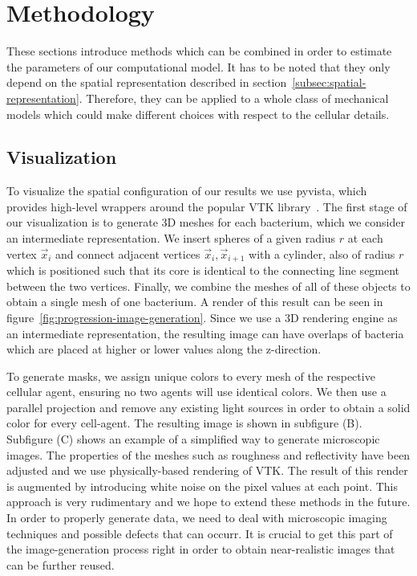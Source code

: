 \documentclass{article}
\begin{document}
\section{Methodology}
These sections introduce methods which can be combined in order to estimate the parameters of our
computational model.
It has to be noted that they only depend on the spatial representation described in
section~\ref{subsec:spatial-representation}.
Therefore, they can be applied to a whole class of mechanical models which could make different
choices with respect to the cellular details.

\subsection{Visualization}
\label{subsection:visualization}

To visualize the spatial configuration of our results we use pyvista, which provides high-level
wrappers around the popular VTK library~\cite{vtkBook,Sullivan2019}.
The first stage of our visualization is to generate 3D meshes for each bacterium, which we consider
an intermediate representation.
We insert spheres of a given radius $r$ at each vertex $\vec{x}_i$ and connect adjacent vertices
$\vec{x}_i,\vec{x}_{i+1}$ with a cylinder, also of radius $r$ which is positioned such that its core
is identical to the connecting line segment between the two vertices.
Finally, we combine the meshes of all of these objects to obtain a single mesh of one bacterium.
A render of this result can be seen in figure~\ref{fig:progression-image-generation}.
Since we use a 3D rendering engine as an intermediate representation, the resulting image can have
overlaps of bacteria which are placed at higher or lower values along the z-direction.

To generate masks, we assign unique colors to every mesh of the respective cellular agent, ensuring
no two agents will use identical colors.
We then use a parallel projection and remove any existing light sources in order to obtain a solid
color for every cell-agent.
The resulting image is shown in subfigure (B).
Subfigure (C) shows an example of a simplified way to generate microscopic images.
The properties of the meshes such as roughness and reflectivity have been adjusted and we use
physically-based rendering of VTK.
The result of this render is augmented by introducing white noise on the pixel values at each point.
This approach is very rudimentary and we hope to extend these methods in the future.
In order to properly generate data, we need to deal with microscopic imaging techniques and possible
defects that can occurr.
It is crucial to get this part of the image-generation process right in order to obtain
near-realistic images that can be further reused.
\end{document}
